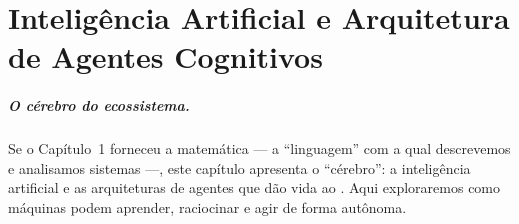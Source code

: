 \chapter{Inteligência Artificial e Arquitetura de Agentes Cognitivos}
\label{cap:inteligencia-artificial-agentes}

\paragraph{O cérebro do ecossistema.} Se o Capítulo~1 forneceu a matemática
--- a ``linguagem'' com a qual descrevemos e analisamos sistemas ---, este
capítulo apresenta o ``cérebro'': a inteligência artificial e as arquiteturas
de agentes que dão vida ao \opencodeeco{}. Aqui exploraremos como máquinas
podem aprender, raciocinar e agir de forma autônoma.

